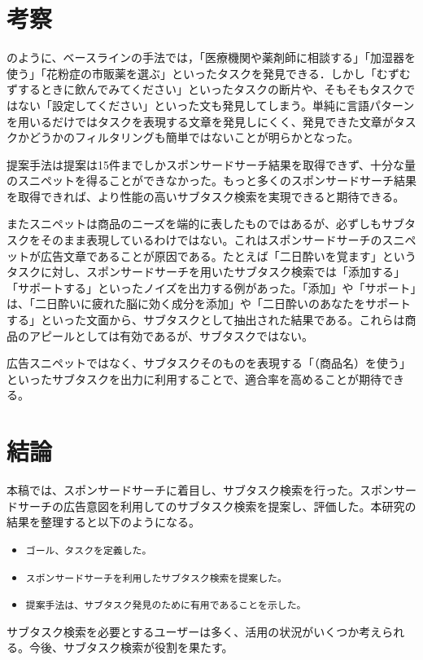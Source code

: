 \documentclass[submit,techreq]{ipsj}
\def\|{\verb|}
\begin{document}
%6
\section{考察}


のように、ベースラインの手法では，「医療機関や薬剤師に相談する」「加湿器を使う」「花粉症の市販薬を選ぶ」といったタスクを発見できる．しかし「むずむずするときに飲んでみてください」といったタスクの断片や、そもそもタスクではない「設定してください」といった文も発見してしまう。単純に言語パターンを用いるだけではタスクを表現する文章を発見しにくく、発見できた文章がタスクかどうかのフィルタリングも簡単ではないことが明らかとなった。

提案手法は提案は15件までしかスポンサードサーチ結果を取得できず、十分な量のスニペットを得ることができなかった。もっと多くのスポンサードサーチ結果を取得できれば、より性能の高いサブタスク検索を実現できると期待できる。

またスニペットは商品のニーズを端的に表したものではあるが、必ずしもサブタスクをそのまま表現しているわけではない。これはスポンサードサーチのスニペットが広告文章であることが原因である。たとえば「二日酔いを覚ます」というタスクに対し、スポンサードサーチを用いたサブタスク検索では「添加する」「サポートする」といったノイズを出力する例があった。「添加」や「サポート」は、「二日酔いに疲れた脳に効く成分を添加」や「二日酔いのあなたをサポートする」といった文面から、サブタスクとして抽出された結果である。これらは商品のアピールとしては有効であるが、サブタスクではない。

広告スニペットではなく、サブタスクそのものを表現する「（商品名）を使う」といったサブタスクを出力に利用することで、適合率を高めることが期待できる。


%7
\section{結論}
本稿では、スポンサードサーチに着目し、サブタスク検索を行った。スポンサードサーチの広告意図を利用してのサブタスク検索を提案し、評価した。本研究の結果を整理すると以下のようになる。


\begin{itemize}
\item \|ゴール、タスクを定義した。|
\item \|スポンサードサーチを利用したサブタスク検索を提案した。|
\item \|提案手法は、サブタスク発見のために有用であることを示した。|
\end{itemize}

サブタスク検索を必要とするユーザーは多く、活用の状況がいくつか考えられる。今後、サブタスク検索が役割を果たす。
\end{document}
